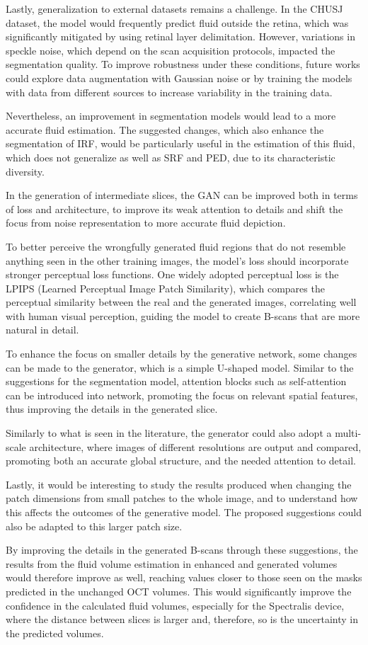 \par
Lastly, generalization to external datasets remains a challenge. In the CHUSJ dataset, the model would frequently predict fluid outside the retina, which was significantly mitigated by using retinal layer delimitation. However, variations in speckle noise, which depend on the scan acquisition protocols, impacted the segmentation quality. To improve robustness under these conditions, future works could explore data augmentation with Gaussian noise or by training the models with data from different sources to increase variability in the training data.
\par
Nevertheless, an improvement in segmentation models would lead to a more accurate fluid estimation. The suggested changes, which also enhance the segmentation of IRF, would be particularly useful in the estimation of this fluid, which does not generalize as well as SRF and PED, due to its characteristic diversity.
\par
In the generation of intermediate slices, the GAN can be improved both in terms of loss and architecture, to improve its weak attention to details and shift the focus from noise representation to more accurate fluid depiction.
\par
To better perceive the wrongfully generated fluid regions that do not resemble anything seen in the other training images, the model's loss should incorporate stronger perceptual loss functions. One widely adopted perceptual loss is the LPIPS (Learned Perceptual Image Patch Similarity), which compares the perceptual similarity between the real and the generated images, correlating well with human visual perception, guiding the model to create B-scans that are more natural in detail. 
\par
To enhance the focus on smaller details by the generative network, some changes can be made to the generator, which is a simple U-shaped model. Similar to the suggestions for the segmentation model, attention blocks such as self-attention can be introduced into network, promoting the focus on relevant spatial features, thus improving the details in the generated slice.
\par
Similarly to what is seen in the literature, the generator could also adopt a multi-scale architecture, where images of different resolutions are output and compared, promoting both an accurate global structure, and the needed attention to detail.
\par
Lastly, it would be interesting to study the results produced when changing the patch dimensions from small patches to the whole image, and to understand how this affects the outcomes of the generative model. The proposed suggestions could also be adapted to this larger patch size.
\par
By improving the details in the generated B-scans through these suggestions, the results from the fluid volume estimation in enhanced and generated volumes would therefore improve as well, reaching values closer to those seen on the masks predicted in the unchanged OCT volumes. This would significantly improve the confidence in the calculated fluid volumes, especially for the Spectralis device, where the distance between slices is larger and, therefore, so is the uncertainty in the predicted volumes.
